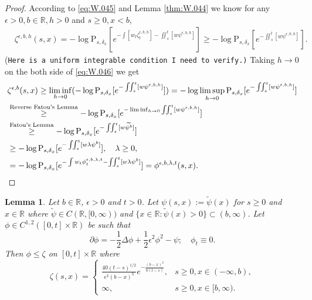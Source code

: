 \documentclass[12pt,a4paper]{amsart}
\numberwithin{equation}{section}
\theoremstyle{plain}
\newtheorem{lemma}[theorem]{Lemma}
\theoremstyle{remark}
\begin{document}
\begin{proof}
	According to \eqref{eq:W.045} and Lemma \ref{thm:W.044} we know for any $\epsilon > 0, b \in \mathbb R, h > 0$ and $s\geq 0, x < b$,
\begin{align} \label{eq:W.046}
	&\zeta^{\epsilon, b , h}(s,x) = - \log \mathrm P_{s, \delta_x} \left[e^{- \int [w_t\zeta^{\epsilon, b , h}_t] - \iint_s^t [w \psi^{\epsilon, b, h}]  }\right]
	\geq - \log \mathrm P_{s, \delta_x} \left[e^{- \iint_s^t [w \psi^{\epsilon, b, h}]  }\right].
\end{align}
	{(\tt Here is a uniform integrable condition I need to verify.)}
	Taking $h \to 0$ on the both side of \eqref{eq:W.046} we get
\begin{align}
	&\zeta^{\epsilon, b}(s,x) \geq \liminf_{h\to 0} (- \log \mathrm P_{s,\delta_x} [e^{- \iint_s^t [w\psi^{\epsilon, b, h}]}]) = -\log \limsup_{h\to 0} \mathrm P_{s,\delta_x} [e^{- \iint_s^t [w\psi^{\epsilon, b, h}]}]
	\\& \overset{\text{Reverse Fatou's Lemma}} \geq - \log \mathrm P_{s,\delta_x} [e^{- \liminf_{h\to 0} \iint_s^t[w\psi^{\epsilon, b, h}]}]
	\\& \overset{\text{Fatou's Lemma}} \geq - \log \mathrm P_{s,\delta_x} [e^{- \iint_s^t[w\widetilde{\psi^b}]}]
	\\& \geq - \log \mathrm P_{s,\delta_x} [e^{- \iint_s^t[w \lambda \psi^b]}], \quad \lambda \geq 0,
	\\& = - \log \mathrm P_{s,\delta_x} [e^{-\int w_t \phi^{\epsilon, b, \lambda, t}_t - \iint_s^t[w \lambda \psi^b]}] = \phi^{\epsilon, b, \lambda,t}(s,x).
	\qedhere
\end{align}
\end{proof}
\begin{lemma}
	Let $b\in \mathbb R$, $\epsilon > 0$ and $t>0$. 
	Let $\psi(s,x):= \tilde \psi (x)$ for $s\geq 0$ and $x\in \mathbb R$ where $\tilde \psi \in C(\mathbb R, [0,\infty))$ and $\{x\in \mathbb R:\tilde \psi(x) >0\} \subset (b,\infty)$.
	Let $\phi \in C^{1,2}([0,t]\times \mathbb R)$ be such that
	\begin{equation}
	\partial \phi = - \frac{1}{2}\Delta\phi + \frac{1}{2}\epsilon^2 \phi^2 - \psi; \quad \phi_t \equiv 0.
	\end{equation}
	Then $\phi \leq \zeta$ on $[0,t] \times \mathbb R$ where
	\begin{equation} \label{eq:W.047}
	\zeta(s,x) = 
	\begin{cases}
	\frac{40 (t-s)^{1/2}}{\epsilon^2 (b-x)^3} e^{- \frac{(b-x)^2}{8(t-s)}}, & s\geq 0,x\in (-\infty, b),
	\\ \infty, & s\geq 0, x\in [b, \infty).
	\end{cases}
	\end{equation}
\end{lemma}
\end{document}
